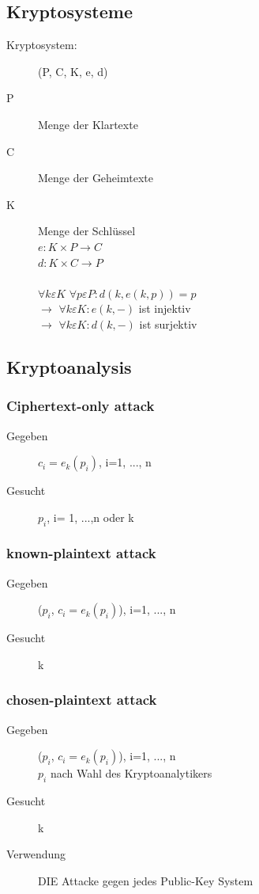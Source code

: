 \documentclass[10pt]{article}
\newcommand{\ra}{\rightarrow}
\begin{document}
\subsection{Kryptosysteme}
\begin{description}
	\item[Kryptosystem:] (P, C, K, e, d)
	\item[P] Menge der {\color{blue}Klartexte}
	\item[C] Menge der {\color{red}Geheimtexte}
	\item[K] Menge der Schlüssel \\
		$e:K\times P \ra C$ \\
		$d:K\times C \ra P$ \\ \\
		$\forall k \varepsilon K$ $\forall p \varepsilon P: d( k, e (k,p))=p$ \\
		$\ra$ $\forall k \varepsilon K : e (k,-)$ ist {\color{blue}injektiv} \\
		$\ra$ $\forall k \varepsilon K : d (k,-)$ ist {\color{red}surjektiv} \\
\end{description}

\subsection{Kryptoanalysis}
\subsubsection{Ciphertext-only attack}
\begin{description}
	\item[Gegeben] $c_i=e_k(p_i)$, i=1, ..., n
	\item[Gesucht] $p_i$, i= 1, ...,n oder k
\end{description}

\subsubsection{known-plaintext attack}
\begin{description}
	\item[Gegeben] ($p_i$, $c_i=e_k(p_i)$), i=1, ..., n
	\item[Gesucht] k
\end{description}

\subsubsection{chosen-plaintext attack}
\begin{description}
	\item[Gegeben] ($p_i$, $c_i=e_k(p_i)$), i=1, ..., n \\
		$p_i$ nach Wahl des Kryptoanalytikers
	\item[Gesucht] k
	\item[Verwendung] DIE Attacke gegen jedes Public-Key System
\end{description}
\end{document}
